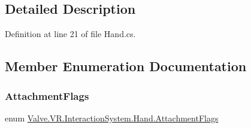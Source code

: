 \subsection{Detailed Description}


Definition at line 21 of file Hand.\+cs.



\subsection{Member Enumeration Documentation}
\mbox{\label{class_valve_1_1_v_r_1_1_interaction_system_1_1_hand_a61701f82b8f3fac8818954ec71804cb5}} 
\subsubsection{\texorpdfstring{AttachmentFlags}{AttachmentFlags}}
{\footnotesize\ttfamily enum \mbox{\hyperlink{class_valve_1_1_v_r_1_1_interaction_system_1_1_hand_a61701f82b8f3fac8818954ec71804cb5}{Valve.\+V\+R.\+Interaction\+System.\+Hand.\+Attachment\+Flags}}\hspace{0.3cm}{\ttfamily [strong]}}

